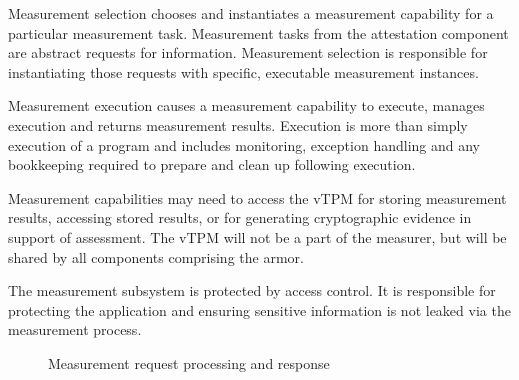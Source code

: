 \documentclass[10pt]{article}
\begin{document}
Measurement selection chooses and instantiates a measurement
capability for a particular measurement task.  Measurement tasks from
the attestation component are abstract requests for information.
Measurement selection is responsible for instantiating those requests
with specific, executable measurement instances.

Measurement execution causes a measurement capability to execute,
manages execution and returns measurement results.  Execution is more
than simply execution of a program and includes monitoring, exception
handling and any bookkeeping required to prepare and clean up
following execution.

Measurement capabilities may need to access the vTPM for storing
measurement results, accessing stored results, or for generating
cryptographic evidence in support of assessment.  The vTPM will not be
a part of the measurer, but will be shared by all components
comprising the armor.

The measurement subsystem is protected by access control.  It
is responsible for protecting the application and ensuring sensitive
information is not leaked via the measurement process.

\begin{figure}
\centering 
{}
  \caption{Measurement request processing and response}
  \label{fig:measurement}
\end{figure}
\end{document}
